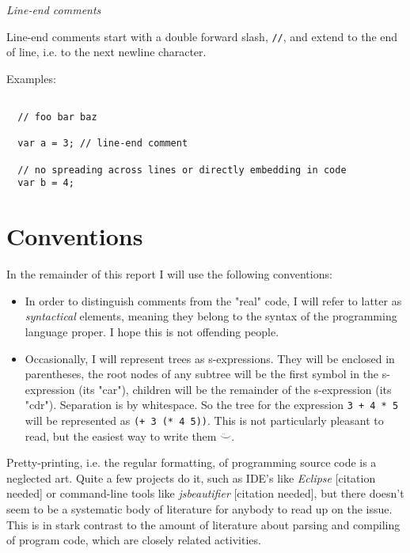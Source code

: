 \documentclass[11pt,a4paper]{article}
\begin{document}
\textit{Line-end comments}

Line-end comments start with a double forward slash, \texttt{//}, and extend to
the end of line, i.e. to the next newline character.

Examples:

\begin{verbatim}

  // foo bar baz
  
  var a = 3; // line-end comment

  // no spreading across lines or directly embedding in code
  var b = 4;

\end{verbatim}

\section{Conventions}

In the remainder of this report I will use the following conventions:

\begin{itemize}
\item In order to distinguish comments from the "real" code, I
will refer to latter as \emph{syntactical} elements, meaning they belong to the
syntax of the programming language proper. I hope this is not offending people.

\item Occasionally, I will represent trees as s-expressions. They will be
enclosed in parentheses, the root nodes of any subtree will be the first symbol
in the s-expression (its "car"), children will be the remainder of the
s-expression (its "cdr"). Separation is by whitespace. So the tree for the
expression \texttt{3 + 4 * 5} will be represented as \texttt{(+ 3 (* 4 5))}.
This is not particularly pleasant to read, but the easiest way to write them
$\ddot\smile$.
\end{itemize}


Pretty-printing, i.e. the regular formatting, of programming source code is a neglected art. Quite a few projects do it, such as IDE's like \emph{Eclipse} [citation needed] or command-line tools like \emph{jsbeautifier} [citation needed], but there doesn't seem to be a systematic body of literature for anybody to read up on the issue. This is in stark contrast to the amount of literature about parsing and compiling of program code, which are closely related activities.
\end{document}
